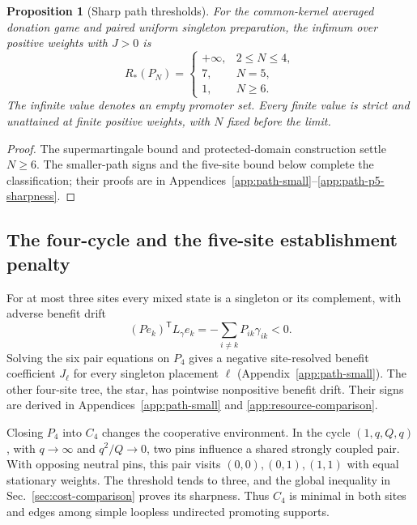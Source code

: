 \documentclass[aps,pre,reprint,amsmath,amssymb,longbibliography]{revtex4-2}
\newtheorem{proposition}[theorem]{Proposition}
\newcommand{\T}{\mathsf T}
\begin{document}
\begin{proposition}[Sharp path thresholds]
\label{thm:path-classification}
For the common-kernel averaged donation game and paired uniform
singleton preparation, the infimum over positive weights with $J>0$ is
\begin{equation}
 R_*(P_N)=
 \begin{cases}
 +\infty,&2\le N\le4,\\
 7,&N=5,\\
 1,&N\ge6.
 \end{cases}
 \label{eq:path-classification}
\end{equation}
The infinite value denotes an empty promoter set. Every finite value
is strict and unattained at finite positive weights, with $N$ fixed
before the limit.
\end{proposition}
\begin{proof}
The supermartingale bound and protected-domain
construction settle $N\ge6$. The smaller-path signs and the five-site
bound below complete the classification; their proofs are in
Appendices~\ref{app:path-small}--\ref{app:path-p5-sharpness}.
\end{proof}

\subsection{The four-cycle and the five-site establishment penalty}
\label{sec:small-supports}\label{sec:five-site-mechanism}
For at most three sites every mixed state is a singleton or its
complement, with adverse benefit drift
\begin{equation}
 (Pe_k)^\T L_\gamma e_k
 =-\sum_{i\ne k}P_{ik}\gamma_{ik}<0.
 \label{eq:small-benefit}
\end{equation}
Solving the six pair equations on $P_4$ gives a negative site-resolved
benefit coefficient $J_\ell$ for every singleton placement $\ell$
(Appendix~\ref{app:path-small}). The other four-site tree, the star, has pointwise nonpositive
benefit drift. Their signs are derived in
Appendices~\ref{app:path-small} and \ref{app:resource-comparison}.

Closing $P_4$ into $C_4$ changes the cooperative environment. In the
cycle $(1,q,Q,q)$, with $q\to\infty$ and $q^2/Q\to0$, two pins
influence a shared strongly coupled pair. With opposing neutral pins,
this pair visits $(0,0),(0,1),(1,1)$ with equal stationary weights.
The threshold tends to three, and the global inequality in
Sec.~\ref{sec:cost-comparison} proves its sharpness. Thus $C_4$ is
minimal in both sites and edges among simple loopless undirected
promoting supports.
\end{document}
